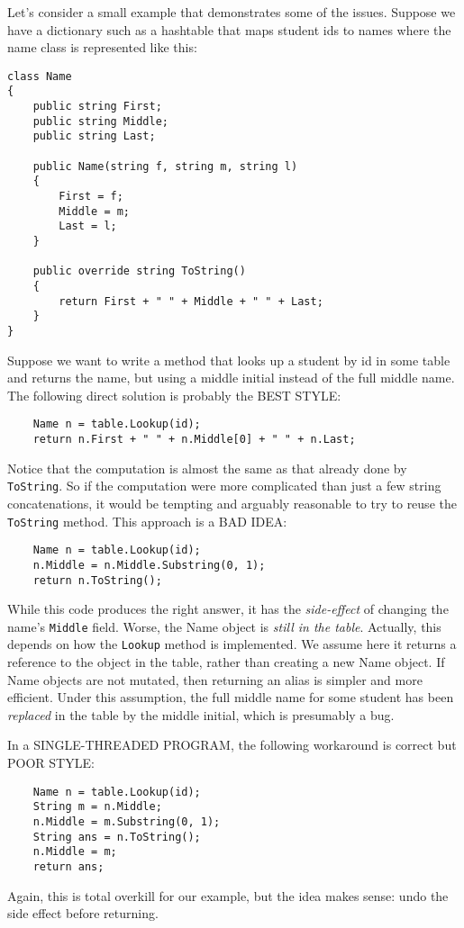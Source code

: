 \documentclass[10pt]{article}
\begin{document}
Let's consider a small example that demonstrates some of the issues.
Suppose we have a dictionary such as a hashtable that maps student ids
to names where the name class is represented like this:
\begin{verbatim}
class Name
{
    public string First;
    public string Middle;
    public string Last;

    public Name(string f, string m, string l)
    {
        First = f;
        Middle = m;
        Last = l;
    }

    public override string ToString()
    {
        return First + " " + Middle + " " + Last;
    }
}
\end{verbatim}
Suppose we want to write a method that looks up a student by id in 
some table and returns the name, but using a middle initial instead of
the full middle name.  The following direct solution is probably the
BEST STYLE:
\begin{verbatim}
    Name n = table.Lookup(id);
    return n.First + " " + n.Middle[0] + " " + n.Last;
\end{verbatim}
Notice that the computation is almost the same as that already done by
{\tt ToString}.  So if the computation were more complicated than just
a few string concatenations, it would be tempting and arguably
reasonable to try to reuse the {\tt ToString} method.  This approach
is a BAD IDEA:
\begin{verbatim}
    Name n = table.Lookup(id);
    n.Middle = n.Middle.Substring(0, 1);
    return n.ToString();
\end{verbatim}
While this code produces the right answer, it has the
\emph{side-effect} of changing the name's {\tt Middle} field.  Worse,
the Name object is \emph{still in the table}.  Actually, this depends on how the
{\tt Lookup} method is implemented.  We assume here it returns a
reference to the object in the table, rather than creating a new 
  Name object.  If Name objects are not mutated, then returning an
  alias is simpler and more efficient.  Under this assumption, the
  full middle name for some student has been \emph{replaced} in the
  table by the middle initial, which is presumably a bug.

In a SINGLE-THREADED PROGRAM, the following workaround is correct but
POOR STYLE:
\begin{verbatim}
    Name n = table.Lookup(id);
    String m = n.Middle;
    n.Middle = m.Substring(0, 1);
    String ans = n.ToString();
    n.Middle = m;
    return ans;
\end{verbatim}
Again, this is total overkill for our example, but the idea makes
sense: undo the side effect before returning.
\end{document}
